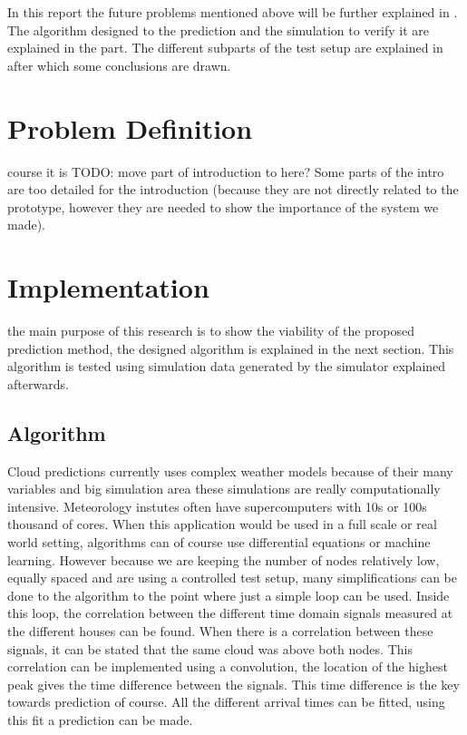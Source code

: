 \documentclass[a4paper,journal]{DDREAM}
\begin{document}
In this report the future problems mentioned above will be further explained in .
The algorithm designed to the prediction and the simulation to verify it are explained in the  part.
The different subparts of the test setup are explained in  after which some conclusions are drawn.

\section{Problem Definition}\label{sec:problem_definition}
 course it is 
TODO: move part of introduction to here?
Some parts of the intro are too detailed for the introduction (because they are not directly related to the prototype, however they are needed to show the importance of the system we made).

\clearpage

\section{Implementation}\label{sec:implementation}
 the main purpose of this research is to show the viability of the proposed prediction method, the designed algorithm is explained in the next section.
This algorithm is tested using simulation data generated by the simulator explained afterwards.

\subsection{Algorithm}\label{sec:implementation-algorithm}
Cloud predictions currently uses complex weather models because of their many variables and big simulation area these simulations are really computationally intensive.
Meteorology instutes often have supercomputers with 10s or 100s thousand of cores.
When this application would be used in a full scale or real world setting, algorithms can of course use differential equations or machine learning.
However because we are keeping the number of nodes relatively low, equally spaced and are using a controlled test setup, many simplifications can be done to the algorithm to the point where just a simple loop can be used.
Inside this loop, the correlation between the different time domain signals measured at the different houses can be found.
When there is a correlation between these signals, it can be stated that the same cloud was above both nodes.
This correlation can be implemented using a convolution, the location of the highest peak gives the time difference between the signals.
This time difference is the key towards prediction of course.
All the different arrival times can be fitted, using this fit a prediction can be made.
\end{document}
